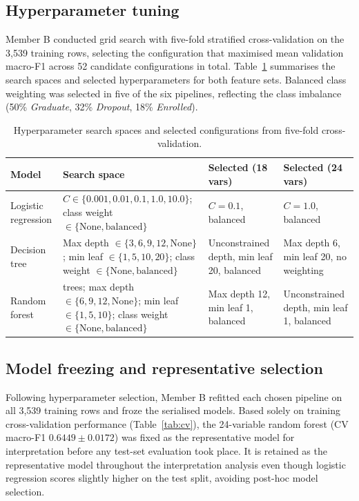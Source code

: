 \documentclass[11pt,a4paper]{article}
\newcommand{\Dropout}{\textit{Dropout}}
\newcommand{\Enrolled}{\textit{Enrolled}}
\newcommand{\Graduate}{\textit{Graduate}}
\begin{document}
\subsection{Hyperparameter tuning}

Member B conducted grid search with five-fold stratified cross-validation on the 3,539 training
rows, selecting the configuration that maximised mean validation macro-F1 across 52 candidate
configurations in total. Table~\ref{tab:hyperparams} summarises the search spaces and selected
hyperparameters for both feature sets. Balanced class weighting was selected in five of the six
pipelines, reflecting the class imbalance (50\% \Graduate{}, 32\% \Dropout{}, 18\% \Enrolled{}).

\begin{table}[H]
\centering
\caption{Hyperparameter search spaces and selected configurations from five-fold cross-validation.}
\label{tab:hyperparams}
\small
\begin{tabularx}{\textwidth}{>{\raggedright\arraybackslash}p{}>{\raggedright\arraybackslash}X>{\raggedright\arraybackslash}p{}>{\raggedright\arraybackslash}p{}}
\toprule
Model & Search space & Selected (18 vars) & Selected (24 vars) \\
\midrule
Logistic regression & $C \in \{0.001, 0.01, 0.1, 1.0, 10.0\}$; class weight $\in \{\text{None}, \text{balanced}\}$ & $C = 0.1$, balanced & $C = 1.0$, balanced \\
Decision tree & Max depth $\in \{3, 6, 9, 12, \text{None}\}$; min leaf $\in \{1, 5, 10, 20\}$; class weight $\in \{\text{None}, \text{balanced}\}$ & Unconstrained depth, min leaf 20, balanced & Max depth 6, min leaf 20, no weighting \\
Random forest & 100 trees; max depth $\in \{6, 9, 12, \text{None}\}$; min leaf $\in \{1, 5, 10\}$; class weight $\in \{\text{None}, \text{balanced}\}$ & Max depth 12, min leaf 1, balanced & Unconstrained depth, min leaf 1, balanced \\
\bottomrule
\end{tabularx}
\normalsize
\end{table}

\subsection{Model freezing and representative selection}

Following hyperparameter selection, Member B refitted each chosen pipeline on all 3,539 training
rows and froze the serialised models. Based solely on training cross-validation performance
(Table~\ref{tab:cv}), the 24-variable random forest (CV macro-F1 $0.6449 \pm 0.0172$) was fixed as
the representative model for interpretation before any test-set evaluation took place. It is
retained as the representative model throughout the interpretation analysis even though logistic
regression scores slightly higher on the test split, avoiding post-hoc model selection.
\end{document}
